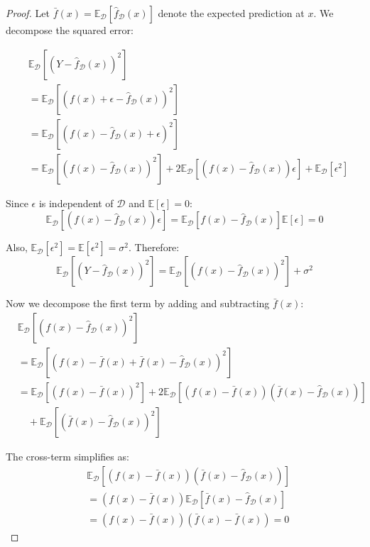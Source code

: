 \documentclass[12pt, a4paper]{article}
\begin{document}
\begin{proof}
Let $\bar{f}(x) = \mathbb{E}_{\mathcal{D}}[\hat{f}_{\mathcal{D}}(x)]$ denote the expected prediction at $x$. We decompose the squared error:

\begin{align}
&\mathbb{E}_{\mathcal{D}}[(Y - \hat{f}_{\mathcal{D}}(x))^2] \nonumber \\
&= \mathbb{E}_{\mathcal{D}}[(f(x) + \epsilon - \hat{f}_{\mathcal{D}}(x))^2] \nonumber \\
&= \mathbb{E}_{\mathcal{D}}[(f(x) - \hat{f}_{\mathcal{D}}(x) + \epsilon)^2] \nonumber \\
&= \mathbb{E}_{\mathcal{D}}[(f(x) - \hat{f}_{\mathcal{D}}(x))^2] + 2\mathbb{E}_{\mathcal{D}}[(f(x) - \hat{f}_{\mathcal{D}}(x))\epsilon] + \mathbb{E}_{\mathcal{D}}[\epsilon^2]
\end{align}

Since $\epsilon$ is independent of $\mathcal{D}$ and $\mathbb{E}[\epsilon] = 0$:
\begin{equation}
\mathbb{E}_{\mathcal{D}}[(f(x) - \hat{f}_{\mathcal{D}}(x))\epsilon] = \mathbb{E}_{\mathcal{D}}[f(x) - \hat{f}_{\mathcal{D}}(x)]\mathbb{E}[\epsilon] = 0
\end{equation}

Also, $\mathbb{E}_{\mathcal{D}}[\epsilon^2] = \mathbb{E}[\epsilon^2] = \sigma^2$. Therefore:
\begin{equation}
\mathbb{E}_{\mathcal{D}}[(Y - \hat{f}_{\mathcal{D}}(x))^2] = \mathbb{E}_{\mathcal{D}}[(f(x) - \hat{f}_{\mathcal{D}}(x))^2] + \sigma^2
\end{equation}

Now we decompose the first term by adding and subtracting $\bar{f}(x)$:
\begin{align}
&\mathbb{E}_{\mathcal{D}}[(f(x) - \hat{f}_{\mathcal{D}}(x))^2] \nonumber \\
&= \mathbb{E}_{\mathcal{D}}[(f(x) - \bar{f}(x) + \bar{f}(x) - \hat{f}_{\mathcal{D}}(x))^2] \nonumber \\
&= \mathbb{E}_{\mathcal{D}}[(f(x) - \bar{f}(x))^2] + 2\mathbb{E}_{\mathcal{D}}[(f(x) - \bar{f}(x))(\bar{f}(x) - \hat{f}_{\mathcal{D}}(x))] \nonumber \\
&\quad + \mathbb{E}_{\mathcal{D}}[(\bar{f}(x) - \hat{f}_{\mathcal{D}}(x))^2]
\end{align}

The cross-term simplifies as:
\begin{align}
&\mathbb{E}_{\mathcal{D}}[(f(x) - \bar{f}(x))(\bar{f}(x) - \hat{f}_{\mathcal{D}}(x))] \nonumber \\
&= (f(x) - \bar{f}(x))\mathbb{E}_{\mathcal{D}}[\bar{f}(x) - \hat{f}_{\mathcal{D}}(x)] \nonumber \\
&= (f(x) - \bar{f}(x))(\bar{f}(x) - \bar{f}(x)) = 0
\end{align}


\end{proof}
\end{document}
